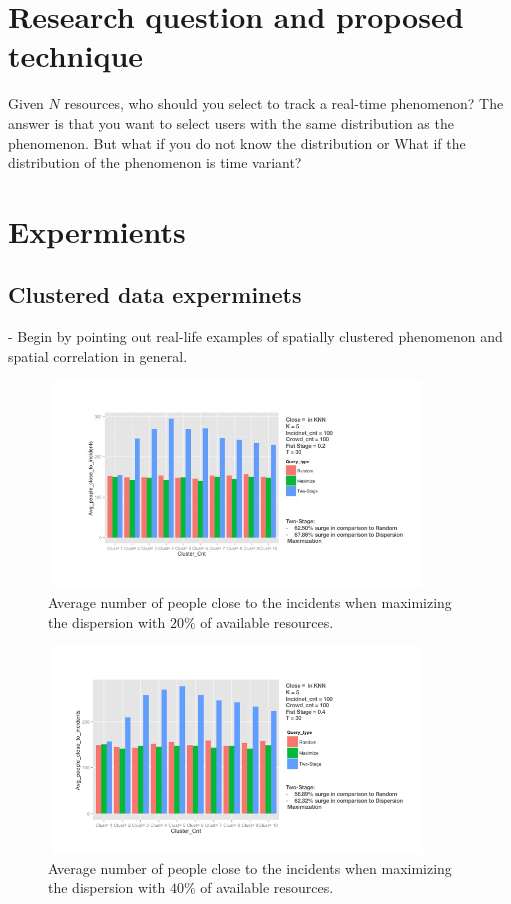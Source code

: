 \documentclass{acm_proc_article-sp}
\begin{document}
\section{Research question and proposed technique}
Given $N$ resources, who should you select to track a real-time phenomenon? 
The answer is that you want to select users with the same distribution as the phenomenon. But what if you do not know the distribution or What if the distribution of the phenomenon is time variant? \cite{adults}

\section{Expermients}
\subsection{Clustered data experminets}
- Begin by pointing out real-life examples of spatially clustered phenomenon and spatial correlation in general.

\begin{figure}[!htb]
\centering
   \includegraphics[width=10cm ,height=5.5cm]{figuresPng/FirstStageTwentyPerc}
   \caption{Average number of people close to the incidents when maximizing the dispersion with $20\%$ of available resources. }\label{fig: heatMap}
\end{figure}

\begin{figure}[!htb]
\centering
   \includegraphics[width=10cm ,height=5.5cm]{figuresPng/FirstStageFortyPerc}
   \caption{Average number of people close to the incidents when maximizing the dispersion with $40\%$ of available resources. }\label{fig: heatMap}
\end{figure}
\end{document}
